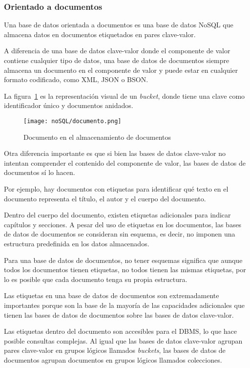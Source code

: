 \subsubsection{Orientado a documentos}
Una base de datos orientada a documentos es una base de datos NoSQL que almacena datos en documentos etiquetados en pares clave-valor.


A diferencia de una base de datos clave-valor donde el componente de valor contiene cualquier tipo de datos, una base de datos de documentos siempre almacena un documento en el componente de valor y puede estar en cualquier formato codificado, como XML, JSON o BSON.


La figura~\ref{img:documentos-documento} es la representación visual de un \textit{bucket}, donde tiene una clave como identificador único y documentos anidados.

\begin{figure}[H]
    \centering
    \texttt{[image: noSQL/documento.png]}
    \caption{Documento en el almacenamiento de documentos}
    \label{img:documentos-documento}
\end{figure}
Otra diferencia importante es que si bien las bases de datos clave-valor no intentan comprender el contenido del componente de valor, las bases de datos de documentos sí lo hacen.%


Por ejemplo, hay documentos con etiquetas para identificar qué texto en el documento representa el título, el autor y el cuerpo del documento.


Dentro del cuerpo del documento, existen etiquetas adicionales para indicar capítulos y secciones. A pesar del uso de etiquetas en los documentos, las bases de datos de documentos se consideran sin esquema, es decir, no imponen una estructura predefinida en los datos almacenados.


Para una base de datos de documentos, no tener esquemas significa que aunque todos los documentos tienen etiquetas, no todos tienen las mismas etiquetas, por lo es posible que cada documento tenga su propia estructura.


Las etiquetas en una base de datos de documentos son extremadamente importantes porque son la base de la mayoría de las capacidades adicionales que tienen las bases de datos de documentos sobre las bases de datos clave-valor.


Las etiquetas dentro del documento son accesibles para el DBMS, lo que hace posible consultas complejas. Al igual que las bases de datos clave-valor agrupan pares clave-valor en grupos lógicos llamados \textit{buckets}, las bases de datos de documentos agrupan documentos en grupos lógicos llamados colecciones.


